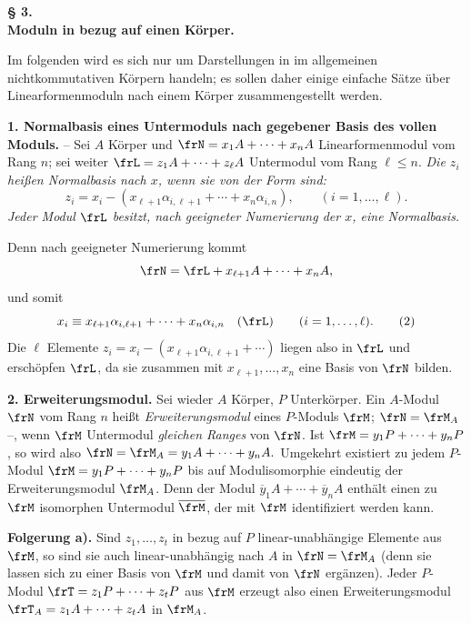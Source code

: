 \begin{center}
\textbf{§ 3.}\\[0.4em]
\textbf{Moduln in bezug auf einen Körper.}
\end{center}

Im folgenden wird es sich nur um Darstellungen in im allgemeinen nichtkommutativen Körpern handeln; es sollen daher einige einfache Sätze über Linearformenmoduln nach einem Körper zusammengestellt werden.

\noindent\textbf{1. Normalbasis eines Untermoduls nach gegebener Basis des vollen Moduls.} -- Sei \(A\) Körper und \(\frN=x_1A+\cdots+x_nA\) Linearformenmodul vom Rang \(n\); sei weiter \(\frL=z_1A+\cdots+z_\ell A\) Untermodul vom Rang \(\ell\le n\). \emph{Die \(z_i\) heißen Normalbasis nach \(x\), wenn sie von der Form sind:}
\[
        z_i=x_i-(x_{\ell+1}\alpha_{i,\ell+1}+\cdots+x_n\alpha_{i,n}),
        \qquad (i=1,\ldots,\ell).
\]
\emph{Jeder Modul \(\frL\) besitzt, nach geeigneter Numerierung der \(x\), eine Normalbasis.}

Denn nach geeigneter Numerierung kommt
\[
        \frN=\frL+x_{\ell+1}A+\cdots+x_nA,
\]
und somit
\[
        x_i\equiv x_{\ell+1}\alpha_{i,\ell+1}+\cdots+x_n\alpha_{i,n}
        \quad(\frL)\qquad (i=1,\ldots,\ell). \tag{2}
\]
Die \(\ell\) Elemente \(z_i=x_i-(x_{\ell+1}\alpha_{i,\ell+1}+\cdots)\) liegen also in \(\frL\) und erschöpfen \(\frL\), da sie zusammen mit \(x_{\ell+1},\ldots,x_n\) eine Basis von \(\frN\) bilden.

\noindent\textbf{2. Erweiterungsmodul.} Sei wieder \(A\) Körper, \(P\) Unterkörper. Ein \(A\)-Modul \(\frN\) vom Rang \(n\) heißt \emph{Erweiterungsmodul} eines \(P\)-Moduls \(\frM\); \(\frN=\frM_A\) --, wenn \(\frM\) Untermodul \emph{gleichen Ranges} von \(\frN\). Ist \(\frM=y_1P+\cdots+y_nP\), so wird also \(\frN=\frM_A=y_1A+\cdots+y_nA.\) Umgekehrt existiert zu jedem \(P\)-Modul \(\frM=y_1P+\cdots+y_nP\) bis auf Modulisomorphie eindeutig der Erweiterungsmodul \(\frM_A\). Denn der Modul \(\overline y_1A+\cdots+\overline y_nA\) enthält einen zu \(\frM\) isomorphen Untermodul \(\overline{\frM}\), der mit \(\frM\) identifiziert werden kann.

\noindent\textbf{Folgerung a).} Sind \(z_1,\ldots,z_t\) in bezug auf \(P\) linear-unabhängige Elemente aus \(\frM\), so sind sie auch linear-unabhängig nach \(A\) in \(\frN=\frM_A\) (denn sie lassen sich zu einer Basis von \(\frM\) und damit von \(\frN\) ergänzen). Jeder \(P\)-Modul \(\frT=z_1P+\cdots+z_tP\) aus \(\frM\) erzeugt also einen Erweiterungsmodul \(\frT_A=z_1A+\cdots+z_tA\) in \(\frM_A\).

